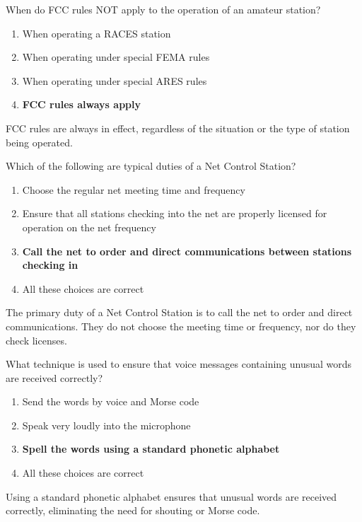 \begin{tcolorbox}[colback=gray!10!white,colframe=black!75!black,title={T2C01}]
    When do FCC rules NOT apply to the operation of an amateur station?
    \begin{enumerate}[label=\Alph*),noitemsep]
        \item When operating a RACES station
        \item When operating under special FEMA rules
        \item When operating under special ARES rules
        \item \textbf{FCC rules always apply}
    \end{enumerate}
\end{tcolorbox}
FCC rules are always in effect, regardless of the situation or the type of station being operated.

\begin{tcolorbox}[colback=gray!10!white,colframe=black!75!black,title={T2C02}]
    Which of the following are typical duties of a Net Control Station?
    \begin{enumerate}[label=\Alph*),noitemsep]
        \item Choose the regular net meeting time and frequency
        \item Ensure that all stations checking into the net are properly licensed for operation on the net frequency
        \item \textbf{Call the net to order and direct communications between stations checking in}
        \item All these choices are correct
    \end{enumerate}
\end{tcolorbox}
The primary duty of a Net Control Station is to call the net to order and direct communications. They do not choose the meeting time or frequency, nor do they check licenses.

\begin{tcolorbox}[colback=gray!10!white,colframe=black!75!black,title={T2C03}]
    What technique is used to ensure that voice messages containing unusual words are received correctly?
    \begin{enumerate}[label=\Alph*),noitemsep]
        \item Send the words by voice and Morse code
        \item Speak very loudly into the microphone
        \item \textbf{Spell the words using a standard phonetic alphabet}
        \item All these choices are correct
    \end{enumerate}
\end{tcolorbox}
Using a standard phonetic alphabet ensures that unusual words are received correctly, eliminating the need for shouting or Morse code.

